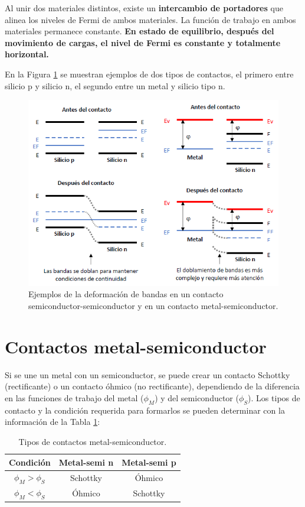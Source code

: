Al unir dos materiales distintos, existe un \textbf{intercambio de portadores} que alinea los niveles de Fermi de ambos materiales. La función de trabajo en ambos materiales permanece constante. \textbf{En estado de equilibrio, después del movimiento de cargas, el nivel de Fermi es constante y totalmente horizontal.}

En la Figura \ref{tipos_de_contactos} se muestran ejemplos de dos tipos de contactos, el primero entre silicio p y silicio n, el segundo entre un metal y silicio tipo n.

\begin{figure}[H]
    \centering
    \includegraphics{figuras/tipos_contactos_MS_SS.png}
    \caption{Ejemplos de la deformación de bandas en un contacto semiconductor-semiconductor y en un contacto metal-semiconductor.}
    \label{tipos_de_contactos}
\end{figure}


\newpage
\section{Contactos metal-semiconductor}

Si se une un metal con un semiconductor, se puede crear un contacto Schottky (rectificante) o un contacto óhmico (no rectificante), dependiendo de la diferencia en las funciones de trabajo del metal ($\phi_M$) y del semiconductor ($\phi_S$). Los tipos de contacto y la condición requerida para formarlos se pueden determinar con la información de la Tabla \ref{tabla_tipos_contacto}:

\begin{table}[H]
    \centering
    \caption{Tipos de contactos metal-semiconductor.}
    \label{tabla_tipos_contacto}
    \begin{tabular}{|c|c|c|}
        \hline \textbf{Condición} & \textbf{Metal-semi n} & \textbf{Metal-semi p} \\
        \hline $\phi_M > \phi_S$ & Schottky & Óhmico \\
               $\phi_M < \phi_S$ & Óhmico & Schottky \\
        \hline
    \end{tabular}
\end{table}

